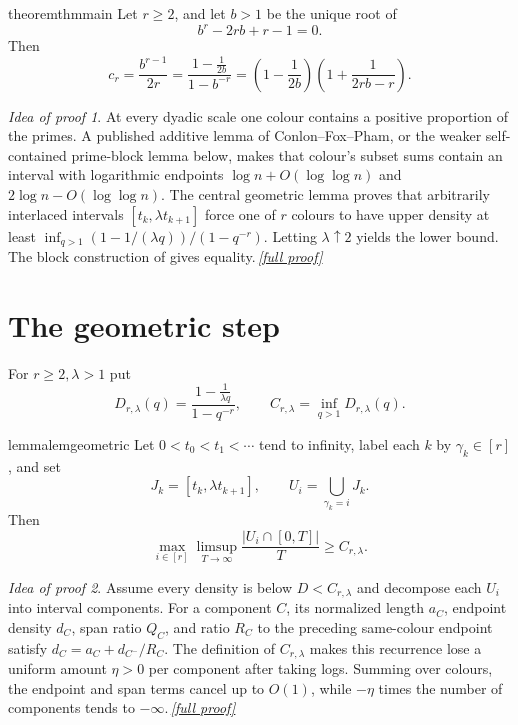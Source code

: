 \documentclass[11pt,a4paper]{article}
\theoremstyle{plain}
\theoremstyle{definition}
\theoremstyle{remark}
\newtheorem*{proofidea}{Idea of proof}
\newcommand{\fullproofref}[1]{\,\hyperref[#1]{\textit{[full proof]}}}
\begin{document}
\begin{restatable}{theorem}{thmmain}\label{thm:main}
Let $r\ge2$, and let $b>1$ be the unique root of
\[
 b^r-2rb+r-1=0.
\]
Then
\[
 c_r=\frac{b^{r-1}}{2r}
 =\frac{1-\frac1{2b}}{1-b^{-r}}
 =\left(1-\frac1{2b}\right)\left(1+\frac1{2rb-r}\right).
\]
\end{restatable}
\begin{proofidea}
At every dyadic scale one colour contains a positive proportion of the
primes. A published additive lemma of Conlon--Fox--Pham, or the weaker
self-contained prime-block lemma below, makes that colour's subset sums
contain an interval with logarithmic endpoints
$\log n+O(\log\log n)$ and $2\log n-O(\log\log n)$. The central geometric
lemma proves that arbitrarily interlaced intervals
$[t_k,\lambda t_{k+1}]$ force one of $r$ colours to have upper density at
least $\inf_{q>1}(1-1/(\lambda q))/(1-q^{-r})$. Letting
$\lambda\uparrow2$ yields the lower bound. The block construction of
\cite[Theorem~1]{CFP22} gives equality.\fullproofref{pf:main}
\end{proofidea}

\section{The geometric step}
For $r\ge2,\lambda>1$ put
\[
 D_{r,\lambda}(q)=\frac{1-\frac1{\lambda q}}{1-q^{-r}},
 \qquad C_{r,\lambda}=\inf_{q>1}D_{r,\lambda}(q).
\]

\begin{restatable}{lemma}{lemgeometric}\label{lem:geometric}
Let $0<t_0<t_1<\cdots$ tend to infinity, label each $k$ by
$\gamma_k\in[r]$, and set
\[
 J_k=[t_k,\lambda t_{k+1}],\qquad
 U_i=\bigcup_{\gamma_k=i}J_k.
\]
Then
\[
 \max_{i\in[r]}\limsup_{T\to\infty}
 \frac{|U_i\cap[0,T]|}{T}\ge C_{r,\lambda}.
\]
\end{restatable}
\begin{proofidea}
Assume every density is below $D<C_{r,\lambda}$ and decompose each
$U_i$ into interval components. For a component $C$, its normalized
length $a_C$, endpoint density $d_C$, span ratio $Q_C$, and ratio $R_C$
to the preceding same-colour endpoint satisfy
$d_C=a_C+d_{C^-}/R_C$. The definition of $C_{r,\lambda}$ makes this
recurrence lose a uniform amount $\eta>0$ per component after taking
logs. Summing over colours, the endpoint and span terms cancel up to
$O(1)$, while $-\eta$ times the number of components tends to
$-\infty$.\fullproofref{pf:geometric}
\end{proofidea}
\end{document}
